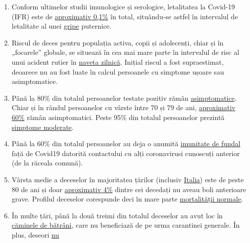 \begin{enumerate}
\def\labelenumi{\arabic{enumi}.}
\tightlist
\item
  Conform ultimelor studii imunologice și serologice, letalitatea la
  Covid-19 (IFR) este de
  \href{https://swprs.org/studies-on-covid-19-lethality/}{aproximativ
  0,1\%} în total, situându-se astfel în intervalul de letalitate al
  unei
  \href{https://www.ebm-netzwerk.de/en/publications/covid-19}{gripe}
  puternice.
\item
  Riscul de deces pentru populația activa, copii și adolecenți, chiar și
  în „focarele'' globale, se situează în cea mai mare parte în
  intervalul de risc al unui acident rutier în
  \href{https://www.medrxiv.org/content/10.1101/2020.04.05.20054361v2}{naveta
  zilnică}. Inițial riscul a fost supraestimat, deoarece nu au fost
  luate în calcul persoanele cu simptome ușoare sau asimptomatice.
\item
  Până la 80\% din totalul persoanelor testate pozitiv rămân
  \href{https://www.bmj.com/content/369/bmj.m1375}{asimptomatice}. Chiar
  și în rândul persoanelor cu vârste între 70 și 79 de ani,
  \href{https://www.niid.go.jp/niid/en/2019-ncov-e/9407-covid-dp-fe-01.html}{aproximativ
  60\%} rămân asimptomatici. Peste 95\% din totalul persoanelor prezintă
  \href{https://swprs.org/studies-on-covid-19-lethality/\#hospitalizations}{simptome
  moderate}.
\item
  Până la 60\% din totalul persoanelor au deja o anumită
  \href{https://www.cell.com/cell/fulltext/S0092-8674(20)30610-3}{imunitate
  de fundal} față de Covid19 datorită contactului cu alți coronavirusi
  cunoscuți anterior (de la răceala comună).
\item
  Vârsta medie a deceselor în majoritatea țărilor (inclusiv
  \href{https://www.epicentro.iss.it/coronavirus/sars-cov-2-decessi-italia}{Italia})
  este de peste 80 de ani și doar
  \href{https://www.bloomberg.com/news/articles/2020-05-26/italy-says-96-of-virus-fatalities-suffered-from-other-illnesses}{aproximativ
  4\%} dintre cei decedați nu aveau boli anterioare grave. Profilul
  deceselor corespunde deci în mare parte
  \href{https://www.vienna.at/analyse-zeigt-covid-19-opferkurve-entspricht-normaler-mortalitaet/6581246}{mortalității
  normale}.
\item
  În multe țări, până la două treimi din totalul deceselor au avut loc
  în
  \href{https://swprs.org/studies-on-covid-19-lethality/\#care-homes}{căminele
  de bătrâni}, care nu beneficiază de pe urma carantinei generale. În
  plus, deseori
  \href{https://www.hsj.co.uk/commissioning/thousands-of-extra-deaths-outside-hospital-not-attributed-to-covid-19/7027459.article}{nu
}
\end{enumerate}
